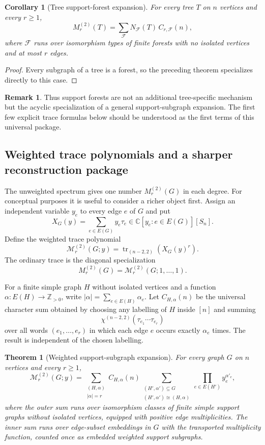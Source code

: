 \documentclass{amsart}
\newtheorem{theorem}{Theorem}
\newtheorem{corollary}{Corollary}
\theoremstyle{definition}
\newtheorem{remark}{Remark}
\newcommand{\C}{\mathbb C}
\newcommand{\tr}{\operatorname{tr}}
\begin{document}
\begin{corollary}[Tree support-forest expansion]
For every tree $T$ on $n$ vertices and every $r\geq1$,
\[
M_r^{(2)}(T)=
\sum_{\mathcal F} N_{\mathcal F}(T)\,C_{r,\mathcal F}(n),
\tag{6.5}
\]
where $\mathcal F$ runs over isomorphism types of finite forests with no
isolated vertices and at most $r$ edges.
\end{corollary}

\begin{proof}
Every subgraph of a tree is a forest, so the preceding theorem specializes
directly to this case.
\end{proof}

\begin{remark}
Thus support forests are not an additional tree-specific mechanism but the
acyclic specialization of a general support-subgraph expansion.  The first
few explicit trace formulas below should be understood as the first terms of
this universal package.
\end{remark}

\subsection{Weighted trace polynomials and a sharper reconstruction package}

The unweighted spectrum gives one number $M_r^{(2)}(G)$ in each degree.
For conceptual purposes it is useful to consider a richer object first.
Assign an independent variable $y_e$ to every edge $e$ of $G$ and put
\[
X_G(y)=\sum_{e\in E(G)} y_e\tau_e\in \C[y_e:e\in E(G)][S_n].
\]
Define the weighted trace polynomial
\[
\mathcal M_r^{(2)}(G;y)=
\tr_{(n-2,2)}\left(X_G(y)^r\right).
\tag{6.6}
\]
The ordinary trace is the diagonal specialization
\[
M_r^{(2)}(G)=\mathcal M_r^{(2)}(G;1,\ldots,1).
\]

For a finite simple graph $H$ without isolated vertices and a function
$\alpha:E(H)\to\mathbb Z_{>0}$, write
$|\alpha|=\sum_{e\in E(H)}\alpha_e$.  Let $C_{H,\alpha}(n)$ be the universal
character sum obtained by choosing any labelling of $H$ inside $[n]$ and
summing
\[
\chi^{(n-2,2)}(\tau_{e_1}\cdots\tau_{e_r})
\tag{6.7}
\]
over all words $(e_1,\ldots,e_r)$ in which each edge $e$ occurs exactly
$\alpha_e$ times.  The result is independent of the chosen labelling.

\begin{theorem}[Weighted support-subgraph expansion]
For every graph $G$ on $n$ vertices and every $r\geq1$,
\[
\mathcal M_r^{(2)}(G;y)=
\sum_{\substack{(H,\alpha)\\ |\alpha|=r}}
C_{H,\alpha}(n)
\sum_{\substack{(H',\alpha')\subseteq G\\
(H',\alpha')\cong(H,\alpha)}}
\prod_{e\in E(H')}y_e^{\alpha'_e},
\tag{6.8}
\]
where the outer sum runs over isomorphism classes of finite simple support
graphs without isolated vertices, equipped with positive edge
multiplicities.  The inner sum runs over edge-subset embeddings in $G$ with
the transported multiplicity function, counted once as embedded weighted
support subgraphs.
\end{theorem}
\end{document}
